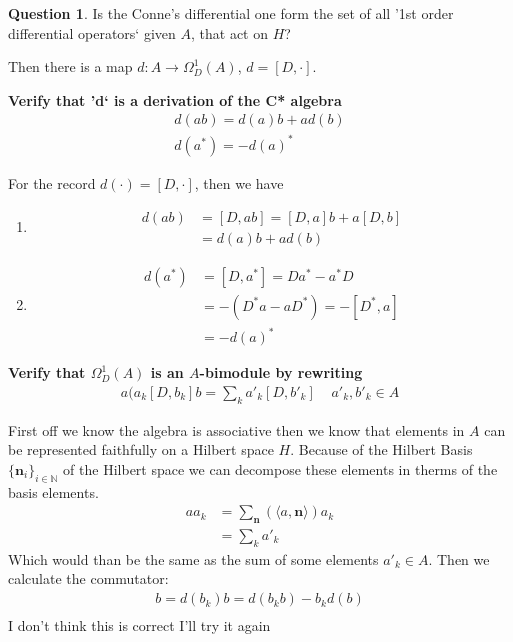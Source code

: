 \documentclass[a4paper]{article}
\newcounter{exercise}
\newenvironment{MyExercise}%
{\begin{mdframed}[style=exercisestyle]}{\end{mdframed}}
\theoremstyle{definition}
\theoremstyle{definition}
\newtheorem{question}{Question}
\theoremstyle{definition}
\theoremstyle{theorem}
\theoremstyle{theorem}
\begin{document}
\begin{question}
    Is the Conne's differential one form  the set of all '1st order
    differential operators` given $A$, that act on $H$?
\end{question}
Then there is a map $d:A\rightarrow \Omega _D ^1 (A)$, $d = [D, \cdot]$.
\begin{MyExercise}
    \textbf{
    Verify that 'd` is a derivation of the C* algebra
    \begin{align*}
        d(ab) = d(a)b + ad(b) \\
        d(a^*) = -d(a)^*
    \end{align*}
}\newline

    For the record $d(\cdot) = [D, \cdot]$, then we have
    \begin{enumerate}
        \item
            \begin{align*}
                d(ab) &= [D, ab] = [D, a]b + a[D,b]\\
                &= d(a)b + ad(b)
            \end{align*}
        \item
            \begin{align*}
                d(a^*) &= [D, a^*] = Da^* - a^*D \\
                &=-(D^*a - aD^*) = -[D^*, a] \\
                &= -d(a)^*
            \end{align*}
    \end{enumerate}
\end{MyExercise}
\begin{MyExercise}
    \textbf{
    Verify that $\Omega _D^1 (A)$ is an $A$-bimodule by rewriting
    }
    \begin{align*}
        a(a_k[D, b_k]b = \sum_k a'_k[D, b'_k] \;\;\;\; a'_k, b'_k \in A
    \end{align*}
    \newline

    First off we know the algebra is associative then we know that elements
    in $A$ can be represented faithfully on a Hilbert space $H$. Because of
    the Hilbert Basis $\{\textbf{n}_i\}_{i\in \mathbb{N}}$ of the Hilbert space we can decompose these elements
    in therms of the basis elements.
    \begin{align*}
        aa_k &= \sum _{\textbf{n}}(\langle a, \textbf{n} \rangle) a_k \\
        &= \sum _{k} a'_{k}
    \end{align*}
    Which would than be the same as the sum of some elements
    $a'_{k} \in A$. Then we calculate the commutator:
    \begin{align*}
        [D, b_k] b = d(b_k)b = d(b_kb) - b_kd(b)\\
    \end{align*}
I don't think this is correct I'll try it again
\end{MyExercise}
\end{document}
